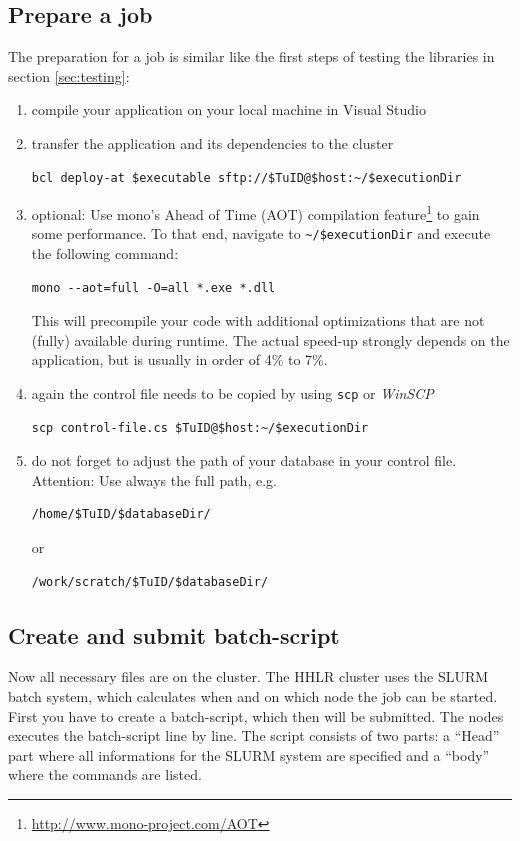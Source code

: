 \documentclass[11pt,twoside,a4paper]{fdyartcl}
\begin{document}
\subsection{Prepare a job}
The preparation for a job is similar like the first steps of testing the libraries in section \ref{sec:testing}:
\begin{enumerate}
\item compile your application on your local machine in Visual Studio
\item transfer the application and its dependencies to the cluster
\begin{verbatim}
bcl deploy-at $executable sftp://$TuID@$host:~/$executionDir
\end{verbatim}
\item optional: Use mono's Ahead of Time (AOT) compilation feature\footnote{\url{http://www.mono-project.com/AOT}} to gain some performance. To that end, navigate to \verb|~/$executionDir| and execute the following command:
\begin{verbatim}
mono --aot=full -O=all *.exe *.dll
\end{verbatim}
This will precompile your code with additional optimizations that are not (fully) available during runtime. The actual speed-up strongly depends on the application, but is usually in order of 4\% to 7\%.
\item again the control file needs to be copied by using \verb|scp| or \emph{WinSCP}
\begin{verbatim}
scp control-file.cs $TuID@$host:~/$executionDir
\end{verbatim}
\item do not forget to adjust the path of your database in your control file. Attention: Use always the full path, e.g.
\begin{verbatim}
/home/$TuID/$databaseDir/
\end{verbatim}
or
\begin{verbatim}
/work/scratch/$TuID/$databaseDir/
\end{verbatim}
\end{enumerate}
\subsection{Create and submit batch-script}
Now all necessary files are on the cluster. The HHLR cluster uses the SLURM batch system, which calculates when and on which node the job can be started. First you have to create a batch-script, which then will be submitted. The nodes executes the batch-script line by line. The script consists of two parts: a ``Head'' part where all informations for the SLURM system are specified and a ``body'' where the commands are listed.\\
\end{document}
